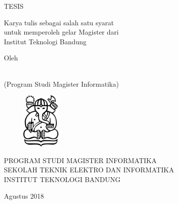 \clearpage
\pagestyle{empty}

\begin{center}
\smallskip
	
	\bfseries \begin{spacing}{1}
    \Large \MakeUppercase{\thetitle}
    \end{spacing}
    \vfill

    \Large \MakeUppercase{Tesis}
	
	\begin{spacing}{1}
    \large
    	Karya tulis sebagai salah satu syarat \\
    	untuk memperoleh gelar Magister dari \\
    	Institut Teknologi Bandung
    \vfill
    \end{spacing}

    \large Oleh
    
    \begin{spacing}{1}
		\Large \MakeUppercase \theauthor \\
		(Program Studi Magister Informatika)  
    \end{spacing}

    \vfill
    \begin{figure}[h]
        \centering
      	\includegraphics[width=0.17\textwidth]{resources/cover-ganesha.jpg}
    \end{figure}
    \vfill

    \large
    \uppercase{
        Program Studi Magister Informatika \\
        Sekolah Teknik Elektro dan Informatika \\
        Institut Teknologi Bandung
    }

    Agustus 2018

\end{center}

\clearpage
